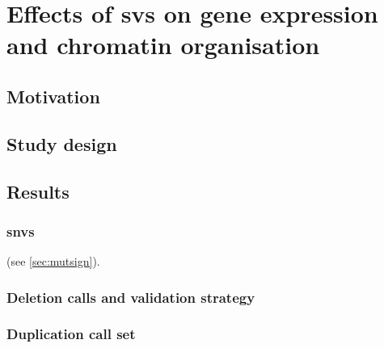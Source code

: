 \chapter{Effects of \acsp{sv} on gene expression and chromatin organisation}
\label{sec:balancer}

\section{Motivation}

\section{Study design}

\section{Results}

\subsection{\Acp{snv}}
(see \cref{sec:mutsign}).

\subsection{Deletion calls and validation strategy}
\subsection{Duplication call set}
